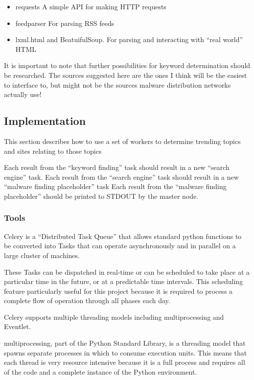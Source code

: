 \begin{itemize}
    \item requests A simple API for making HTTP requests
    \item feedparser For parsing RSS feeds
    \item lxml.html and BeatuifulSoup. For parsing and interacting with ``real world'' HTML
\end{itemize}

It is important to note that further possibilities for keyword determination should be researched. The sources suggested here are the ones I think will be the easiest to interface to, but might not be the sources malware distribution networks actually use!

\subsection{Implementation}
This section describes how to use a set of workers to determine trending topics and sites relating to those topics

Each result from the ``keyword finding'' task should result in a new ``search engine'' task.
Each result from the ``search engine'' task should result in a new ``malware finding placeholder'' task
Each result from the ``malware finding placeholder'' should be printed to STDOUT by the master node.
\subsubsection{Tools}
Celery is a ``Distributed Task Queue'' that allows standard python functions to be converted into Tasks that can operate asynchronously and in parallel on a large cluster of machines.

These Tasks can be dispatched in real-time or can be scheduled to take place at a particular time in the future, or at a predictable time intervals.  This scheduling feature particularly useful for this project because it is required to process a complete flow of operation through all phases each day.

Celery supports multiple threading models including multiprocessing and Eventlet.

multiprocessing, part of the Python Standard Library, is a threading model that spawns separate processes in which to consume execution units.  This means that each thread is very resource intensive because it is a full process and requires all of the code and a complete instance of the Python environment.

